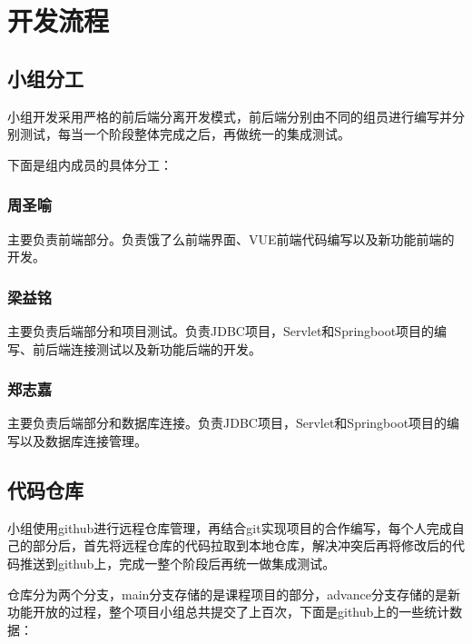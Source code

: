 
\chapter{开发流程}

\section{小组分工}

小组开发采用严格的前后端分离开发模式，前后端分别由不同的组员进行编写并分别测试，每当一个阶段整体完成之后，再做统一的集成测试。

下面是组内成员的具体分工：

\subsection*{周圣喻}主要负责前端部分。负责饿了么前端界面、VUE前端代码编写以及新功能前端的开发。

\subsection*{梁益铭}主要负责后端部分和项目测试。负责JDBC项目，Servlet和Springboot项目的编写、前后端连接测试以及新功能后端的开发。

\subsection*{郑志嘉}主要负责后端部分和数据库连接。负责JDBC项目，Servlet和Springboot项目的编写以及数据库连接管理。
~\\
\section{代码仓库}

小组使用github进行远程仓库管理，再结合git实现项目的合作编写，每个人完成自己的部分后，首先将远程仓库的代码拉取到本地仓库，解决冲突后再将修改后的代码推送到github上，完成一整个阶段后再统一做集成测试。

仓库分为两个分支，main分支存储的是课程项目的部分，advance分支存储的是新功能开放的过程，整个项目小组总共提交了上百次，下面是github上的一些统计数据：

